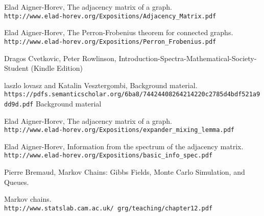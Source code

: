 \documentclass[a4paper, 11pt, oneside]{article}
\begin{document}
\begin{thebibliography}{9} 
Elad Aigner-Horev,
The adjacency matrix of a graph.
\\\texttt{http://www.elad-horev.org/Expositions/Adjacency\_Matrix.pdf}

Elad Aigner-Horev,
The Perron-Frobenius theorem for connected graphs.
\\\texttt{http://www.elad-horev.org/Expositions/Perron\_Frobenius.pdf}

Dragos Cvetkovic, Peter Rowlinson,
Introduction-Spectra-Mathematical-Society-Student (Kindle Edition)

laszlo lovasz and Katalin Vesztergombi,
Background material.
\\\texttt{https://pdfs.semanticscholar.org/6ba8/74424408264214220c2785d4bdf521a9dd9d.pdf}
Background material

Elad Aigner-Horev,
The adjacency matrix of a graph.
\\\texttt{http://www.elad-horev.org/Expositions/expander\_mixing\_lemma.pdf}

Elad Aigner-Horev,
Information from the spectrum of the adjacency matrix.
\\\texttt{http://www.elad-horev.org/Expositions/basic\_info\_spec.pdf}

Pierre Bremaud,
Markov Chains: Gibbs Fields, Monte Carlo Simulation, and Queues.

Markov chains.
\\\texttt{http://www.statslab.cam.ac.uk/~grg/teaching/chapter12.pdf}
\end{thebibliography}
\end{document}
